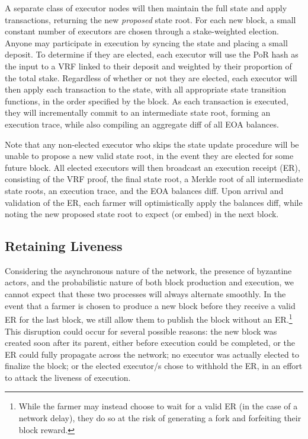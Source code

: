 \documentclass[conference]{IEEEtran}
\begin{document}
A separate class of executor nodes will then maintain the full state and apply transactions, returning the new \textit{proposed} state root. For each new block, a small constant number of executors are chosen through a stake-weighted election. Anyone may participate in execution by syncing the state and placing a small deposit. To determine if they are elected, each executor will use the PoR hash as the input to a VRF linked to their deposit and weighted by their proportion of the total stake. Regardless of whether or not they are elected, each executor will then apply each transaction to the state, with all appropriate state transition functions, in the order specified by the block. As each transaction is executed, they will incrementally commit to an intermediate state root, forming an execution trace, while also compiling an aggregate diff of all EOA balances. 

Note that any non-elected executor who skips the state update procedure will be unable to propose a new valid state root, in the event they are elected for some future block. All elected executors will then broadcast an execution receipt (ER), consisting of the VRF proof, the final state root, a Merkle root of all intermediate state roots, an execution trace, and the EOA balances diff. Upon arrival and validation of the ER, each farmer will optimistically apply the balances diff, while noting the new  proposed state root to expect (or embed) in the next block.

\subsection{Retaining Liveness}

Considering the asynchronous nature of the network, the presence of byzantine actors, and the probabilistic nature of both block production and execution, we cannot expect that these two processes will always alternate smoothly. In the event that a farmer is chosen to produce a new block before they receive a valid ER for the last block, we still allow them to publish the block without an ER.\footnote{While the farmer may instead choose to wait for a valid ER (in the case of a network delay), they do so at the risk of generating a fork and forfeiting their block reward.} This disruption could occur for several possible reasons: the new block was created soon after its parent, either before execution could be completed, or the ER could fully propagate across the network; no executor was actually elected to finalize the block; or the elected executor/s chose to withhold the ER, in an effort to attack the liveness of execution. 
\end{document}
